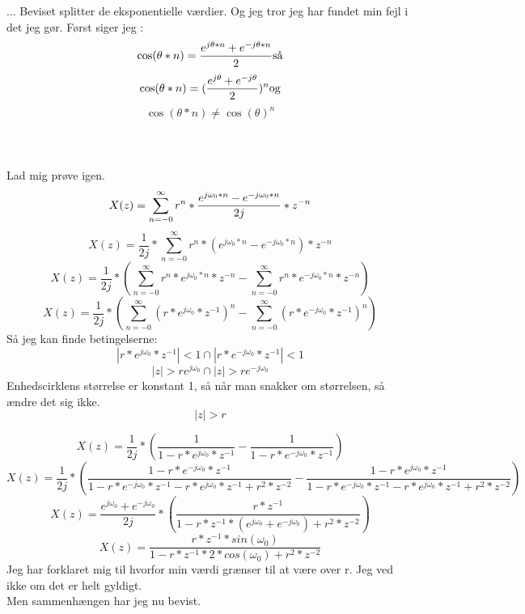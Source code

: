 \begin{Opgaver}
\begin{kapitel}[Z transformation]
\begin{Opgave}
            ... 
            Beviset splitter de eksponentielle værdier. Og jeg tror jeg har fundet min fejl i det jeg gør.
            Først siger jeg :
            \[\cos(\theta*n) = \frac{e^{j\theta*n} + e^{-j\theta*n}}{2} \text{så}\]  
            \[\cos(\theta*n) = (\frac{e^{j\theta} + e^{-j\theta}}{2})^n \text{og}\]
            \[\cos(\theta*n) \neq \cos(\theta)^n\]
            \\\\\\
            Lad mig prøve igen.
            \[X(z) = \sum_{n=-0}^{\infty}{r^n * \frac{e^{j\omega_0 * n} - e^{-j\omega_0 * n}}{2j} * z^{-n}}\]
            \[X(z) = \frac{1}{2j} * \sum_{n=-0}^{\infty}{r^n * (e^{j\omega_0*n} - e^{-j\omega_0*n}) * z^{-n}}\]
            \[X(z) = \frac{1}{2j} * (\sum_{n=-0}^{\infty}{r^n * e^{j\omega_0*n} * z^{-n}} - \sum_{n=-0}^{\infty}{r^n * e^{-j\omega_0*n} * z^{-n}})\]
            \[X(z) = \frac{1}{2j} * (\sum_{n=-0}^{\infty}{(r * e^{j\omega_0} * z^{-1})^n} - \sum_{n=-0}^{\infty}{(r * e^{-j\omega_0} * z^{-1})^n})\]
            Så jeg kan finde betingelserne: 
            \[|r*e^{j\omega_0} * z^{-1}| < 1 \cap |r*e^{-j\omega_0}*z^{-1}| < 1\]
            \[|z| > re^{j\omega_0} \cap |z| > re^{-j\omega_0}\]
            Enhedscirklens størrelse er konstant 1, så når man snakker om størrelsen, så ændre det sig ikke. 
            \[|z| > r\]
            
            \[X(z) = \frac{1}{2j} * (\frac{1}{1 - r * e^{j\omega_0} * z^{-1}} - \frac{1}{1 - r * e^{-j\omega_0} * z^{-1}})\]
            \[X(z) = \frac{1}{2j} * (\frac{1 - r * e^{-j\omega_0} * z^{-1}}{1 - r * e^{-j\omega_0} * z^{-1} - r * e^{j\omega_0} * z^{-1} + r^2 * z^{-2}} - \frac{1 - r * e^{j\omega_0} * z^{-1}}{1 - r * e^{-j\omega_0} * z^{-1} - r * e^{j\omega_0} * z^{-1} + r^2 * z^{-2}})\]
            \[X(z) = \frac{e^{j\omega_0} + e^{-j\omega_0}}{2j} * (\frac{r * z^{-1}}{1 - r * z^{-1} * (e^{j\omega_0} + e^{-j\omega_0}) + r^2 * z^{-2}})\]
            \[X(z) = \frac{r * z^{-1} * sin(\omega_0)}{1 - r * z^{-1} * 2*cos(\omega_0) + r^2 * z^{-2}}\]
            Jeg har forklaret mig til hvorfor min værdi grænser til at være over r. Jeg ved ikke om det er helt gyldigt. \\
            Men sammenhængen har jeg nu bevist.
        \end{Opgave}
        \begin{Opgave}
            

\end{Opgave}
\end{kapitel}
\end{Opgaver}
